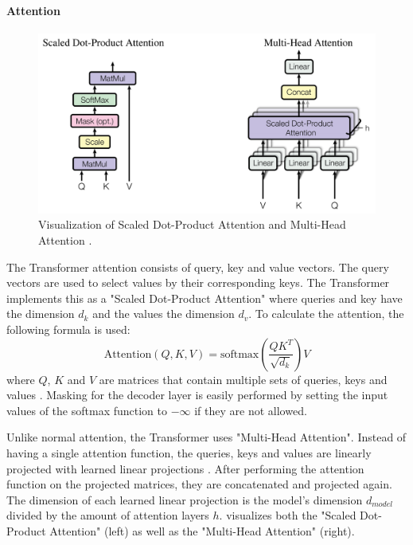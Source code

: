 \paragraph{Attention}

\begin{figure}[h]
\centering
\includegraphics[width=0.7\paperwidth]{figures/scaled-dot-product-multihead-attention}
\caption[Visualization of Scaled Dot-Product Attention and Multi-Head Attention]{Visualization of Scaled Dot-Product Attention and Multi-Head Attention \cite[p.~4]{1706.03762}.}
\label{fig:scaled-dot-product-multihead-attention}
\end{figure}

The Transformer attention consists of query, key and value vectors.
The query vectors are used to select values by their corresponding keys.
The Transformer implements this as a "Scaled Dot-Product Attention" where queries and key have the dimension $d_k$ and the values the dimension $d_v$.
To calculate the attention, the following formula is used:
\[
	\textrm{Attention}(Q,K,V) = \textrm{softmax}(\dfrac{QK^T}{\sqrt{d_k}})V
\]
where $Q$, $K$ and $V$ are matrices that contain multiple sets of queries, keys and values \cite[p.~3--4]{1706.03762}.
Masking for the decoder layer is easily performed by setting the input values of the softmax function to $-\infty$ if they are not allowed.

Unlike normal attention, the Transformer uses "Multi-Head Attention".
Instead of having a single attention function, the queries, keys and values are linearly projected with learned linear projections \cite[p.~4--5]{1706.03762}.
After performing the attention function on the projected matrices, they are concatenated and projected again.
The dimension of each learned linear projection is the model's dimension $d_{model}$ divided by the amount of attention layers $h$.
 visualizes both the "Scaled Dot-Product Attention" (left) as well as the "Multi-Head Attention" (right).

